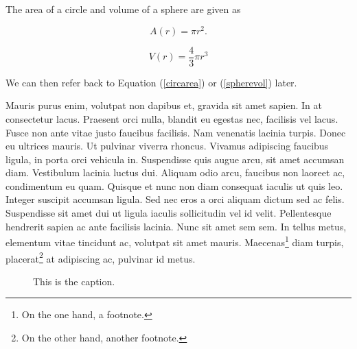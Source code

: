 The area of a circle and volume of a sphere are given as

\begin{equation}
    \label{circarea}
    A(r) = \pi r^2.
\end{equation}

\begin{equation}
    \label{spherevol}
    V(r) = \frac{4}{3} \pi r^3
\end{equation}

We can then refer back to Equation (\ref{circarea}) or
(\ref{spherevol}) later.

Mauris purus enim, volutpat non dapibus et, gravida sit amet sapien. In at
consectetur lacus. Praesent orci nulla, blandit eu egestas nec, facilisis vel
lacus. Fusce non ante vitae justo faucibus facilisis. Nam venenatis lacinia
turpis. Donec eu ultrices mauris. Ut pulvinar viverra rhoncus. Vivamus
adipiscing faucibus ligula, in porta orci vehicula in. Suspendisse quis augue
arcu, sit amet accumsan diam. Vestibulum lacinia luctus dui. Aliquam odio arcu,
faucibus non laoreet ac, condimentum eu quam. Quisque et nunc non diam
consequat iaculis ut quis leo. Integer suscipit accumsan ligula. Sed nec eros a
orci aliquam dictum sed ac felis. Suspendisse sit amet dui ut ligula iaculis
sollicitudin vel id velit. Pellentesque hendrerit sapien ac ante facilisis
lacinia. Nunc sit amet sem sem. In tellus metus, elementum vitae tincidunt ac,
volutpat sit amet mauris. Maecenas\footnote{On the one hand, a footnote.} diam
turpis, placerat\footnote{On the other hand, another footnote.} at adipiscing
ac, pulvinar id metus.

\begin{figure}[]
    \noindent
    \caption{This is the caption. \label{egfig}}
\end{figure}

